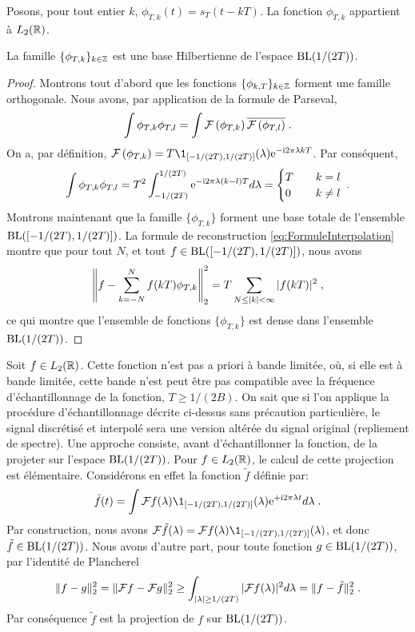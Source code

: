 Posons, pour tout entier $k$, $\phi_{T,k}(t) = s_T(t- k T)$. La fonction $\phi_{T,k}$ appartient {\`a} $L_2(\mathbb{R})$.
\begin{proposition}
\label{prop:SincBH}
La famille $\{ \phi_{T,k} \}_{k \in \mathbb{Z}}$ est une base Hilbertienne de l'espace $\mathrm{BL}(1/(2T))$.
\end{proposition}
\begin{proof}
Montrons tout d'abord que les fonctions $\{ \phi_{k,T} \}_{k \in \mathbb{Z}}$ forment une famille orthogonale. Nous avons, par application de la formule
de Parseval,
$$
\int \phi_{T,k} \phi_{T,l} = \int \mathcal{F}\left( \phi_{T,k} \right) \overline{\mathcal{F}\left( \phi_{T,l} \right)} \;.
$$
On a, par d{\'e}finition, $\TFA{\phi_{T,k}}= T \1_{[-1/(2T),1/(2T)]}(\lambda) \rme^{- \rmi 2 \pi \lambda k T}$. Par cons{\'e}quent,
$$
\int \phi_{T,k} \phi_{T,l} = T^2 \int_{-1/(2T)}^{1/(2T)} \mathrm{e}^{- \mathrm{i} 2 \pi \lambda (k-l) T} d \lambda = \begin{cases} T & \quad k = l \\ 0 & \quad k \ne l \end{cases} \;.
$$
Montrons maintenant que la famille $\{ \phi_{T,k} \}$ forment une
base totale de l'ensemble $\mathrm{BL}([-1/(2T),1/(2T)])$. La formule de reconstruction \eqref{eq:FormuleInterpolation} montre que pour tout $N$,
et tout $f \in \mathrm{BL}([-1/(2T),1/(2T)])$, nous avons
$$
\left \| f - \sum_{k=-N}^N f(kT) \phi_{T,k}  \right \|_2^2 = T \sum_{N \leq |k| < \infty} |f(kT)|^2 \;,
$$
ce qui montre que l'ensemble de fonctions $\{ \phi_{T,k} \}$ est dense dans l'ensemble $\mathrm{BL}(1/(2T))$.
\end{proof}
Soit $f \in L_2(\mathbb{R})$. Cette fonction n'est pas a priori {\`a} bande limit{\'e}e, o{\`u}, si elle est {\`a} bande limit{\'e}e, cette bande
n'est peut {\^e}tre pas compatible avec la fr{\'e}quence d'{\'e}chantillonnage de la fonction, $T \geq 1/(2B)$. On sait que si l'on applique
la proc{\'e}dure d'{\'e}chantillonnage d{\'e}crite ci-dessus sans pr{\'e}caution particuli{\`e}re, le signal discr{\'e}tis{\'e} et interpol{\'e} sera une version alt{\'e}r{\'e}e
du signal original (repliement de spectre). Une approche consiste, avant d'{\'e}chantillonner la fonction, de la projeter sur l'espace
$\mathrm{BL}(1/(2T))$. Pour $f \in L_2(\mathbb{R})$, le calcul de cette projection est {\'e}l{\'e}mentaire. Consid{\'e}rons en effet la fonction $\tilde{f}$ d{\'e}finie
par:
$$
\tilde{f}(t) = \int \TF f (\lambda)  \1_{[-1/(2T),1/(2T)]}(\lambda) \rme^{+ \rmi 2 \pi \lambda t} d \lambda \eqsp.
$$
Par construction, nous avons $\TF \tilde{f} (\lambda) = \TF f (\lambda)  \1_{[-1/(2T),1/(2T)]}(\lambda)$, et donc $\tilde{f} \in \mathrm{BL}(1/(2T))$.
Nous avons d'autre part, pour toute fonction $g \in \mathrm{BL}(1/(2T))$, par l'identit{\'e} de Plancherel
$$
\| f - g \|_2^2 = \| \mathcal{F} f - \mathcal{F} g \|_2^2 \geq \int_{|\lambda| \geq 1/(2T)} | \mathcal{F} f (\lambda)|^2 d \lambda = \| f - \tilde{f} \|_2^2 \;.
$$
Par cons{\'e}quence $\tilde{f}$ est la projection de $f$ sur $\mathrm{BL}(1/(2T))$.


